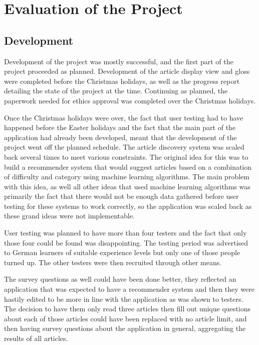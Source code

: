 \chapter{Evaluation of the Project}

\section{Development}

Development of the project was mostly successful, and the first part of the project proceeded as planned. Development of the article display view and gloss were completed before the Christmas holidays, as well as the progress report detailing the state of the project at the time. Continuing as planned, the paperwork needed for ethics approval was completed over the Christmas holidays. 

Once the Christmas holidays were over, the fact that user testing had to have happened before the Easter holidays and the fact that the main part of the application had already been developed, meant that the development of the project went off the planned schedule. The article discovery system was scaled back several times to meet various constraints. The original idea for this was to build a recommender system that would suggest articles based on a combination of difficulty and category using machine learning algorithms. The main problem with this idea, as well all other ideas that used machine learning algorithms was primarily the fact that there would not be enough data gathered before user testing for these systems to work correctly, so the application was scaled back as these grand ideas were not implementable.

User testing was planned to have more than four testers and the fact that only those four could be found was disappointing. The testing period was advertised to German learners of suitable experience levels but only one of those people turned up. The other testers were then recruited through other means. 

The survey questions as well could have been done better, they reflected an application that was expected to have a recommender system and then they were hastily edited to be more in line with the application as was shown to testers. The decision to have them only read three articles then fill out unique questions about each of those articles could have been replaced with no article limit, and then having survey questions about the application in general, aggregating the results of all articles.

